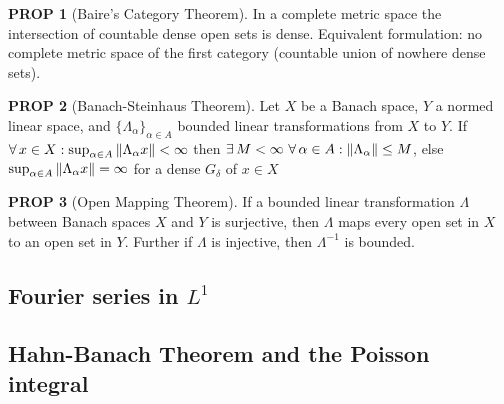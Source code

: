 \documentclass[hidelinks,10pt]{article}
\theoremstyle{definition}
\theoremstyle{dotles}
\theoremstyle{dotless}
\newtheorem{proposition}{PROP}[section]
\theoremstyle{remark}
\begin{document}
\begin{proposition}[Baire's Category Theorem]In a complete metric space the intersection of countable dense open sets is dense. Equivalent formulation: no complete metric space of the first category (countable union of nowhere dense sets).
\end{proposition}

\begin{proposition}[Banach-Steinhaus Theorem]
Let $X$ be a Banach space, $Y$ a normed linear space, and $\{\Lambda_\alpha\}_{\alpha\in A}$ bounded linear transformations from $X$ to $Y$. If $\forall\,x\in X:\sup_{\alpha\in A}\norm{\Lambda_\alpha x}<\infty$ then $\exists\,M<\infty\ \forall\,\alpha\in A:\norm{\Lambda_\alpha}\leq M$, else $\sup_{\alpha\in A}\norm{\Lambda_\alpha x}=\infty$ for a dense $G_\delta$ of $x\in X$
\end{proposition}

\begin{proposition}[Open Mapping Theorem]
If a bounded linear transformation $\Lambda$ between Banach spaces $X$ and $Y$ is surjective, then $\Lambda$ maps every open set in $X$ to an open set in $Y$. Further if $\Lambda$ is injective, then $\Lambda^{-1}$ is bounded.
\end{proposition}

\subsection{Fourier series in $L^1$}

\subsection{Hahn-Banach Theorem and the Poisson integral}
\end{document}
